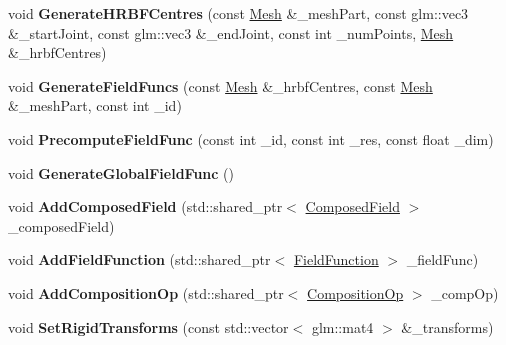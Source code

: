 \begin{DoxyCompactItemize}
\item 
void {\bfseries Generate\+H\+R\+B\+F\+Centres} (const \hyperlink{classMesh}{Mesh} \&\+\_\+mesh\+Part, const glm\+::vec3 \&\+\_\+start\+Joint, const glm\+::vec3 \&\+\_\+end\+Joint, const int \+\_\+num\+Points, \hyperlink{classMesh}{Mesh} \&\+\_\+hrbf\+Centres)\hypertarget{classGlobalFieldFunction_a4e3740f30ea28bb9b6fe1cdd92f0706b}{}\label{classGlobalFieldFunction_a4e3740f30ea28bb9b6fe1cdd92f0706b}

\item 
void {\bfseries Generate\+Field\+Funcs} (const \hyperlink{classMesh}{Mesh} \&\+\_\+hrbf\+Centres, const \hyperlink{classMesh}{Mesh} \&\+\_\+mesh\+Part, const int \+\_\+id)\hypertarget{classGlobalFieldFunction_a32583dc655877c87063c28363fddf675}{}\label{classGlobalFieldFunction_a32583dc655877c87063c28363fddf675}

\item 
void {\bfseries Precompute\+Field\+Func} (const int \+\_\+id, const int \+\_\+res, const float \+\_\+dim)\hypertarget{classGlobalFieldFunction_ac670342d15dbc08ede726af118e7ac7a}{}\label{classGlobalFieldFunction_ac670342d15dbc08ede726af118e7ac7a}

\item 
void {\bfseries Generate\+Global\+Field\+Func} ()\hypertarget{classGlobalFieldFunction_a359ad40bd85555529a05f4ba8c52dea5}{}\label{classGlobalFieldFunction_a359ad40bd85555529a05f4ba8c52dea5}

\item 
void {\bfseries Add\+Composed\+Field} (std\+::shared\+\_\+ptr$<$ \hyperlink{classComposedField}{Composed\+Field} $>$ \+\_\+composed\+Field)\hypertarget{classGlobalFieldFunction_a9e22015664f10286c786f96dccb24ed4}{}\label{classGlobalFieldFunction_a9e22015664f10286c786f96dccb24ed4}

\item 
void {\bfseries Add\+Field\+Function} (std\+::shared\+\_\+ptr$<$ \hyperlink{classFieldFunction}{Field\+Function} $>$ \+\_\+field\+Func)\hypertarget{classGlobalFieldFunction_a8fbdf65e403f123aa8e8c7b6e2fad13d}{}\label{classGlobalFieldFunction_a8fbdf65e403f123aa8e8c7b6e2fad13d}

\item 
void {\bfseries Add\+Composition\+Op} (std\+::shared\+\_\+ptr$<$ \hyperlink{classCompositionOp}{Composition\+Op} $>$ \+\_\+comp\+Op)\hypertarget{classGlobalFieldFunction_a04591e62e352ff472d2b5c6c8ea1f876}{}\label{classGlobalFieldFunction_a04591e62e352ff472d2b5c6c8ea1f876}

\item 
void {\bfseries Set\+Rigid\+Transforms} (const std\+::vector$<$ glm\+::mat4 $>$ \&\+\_\+transforms)\hypertarget{classGlobalFieldFunction_aa1a3835c54b9b701f65f53c3ffd7f3b6}{}\label{classGlobalFieldFunction_aa1a3835c54b9b701f65f53c3ffd7f3b6}


\end{DoxyCompactItemize}
